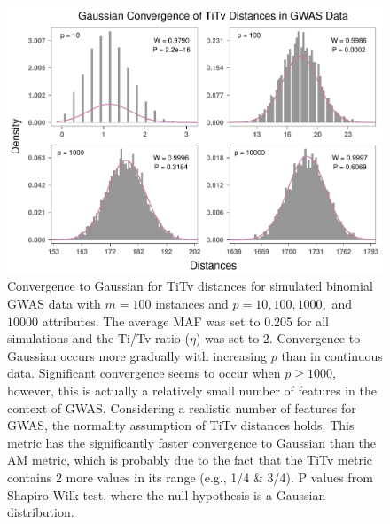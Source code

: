 \documentclass[10pt,letterpaper]{article}\usepackage[]{graphicx}\usepackage[]{color}
\begin{document}
\begin{figure}[H]
	\includegraphics[width=\textwidth]{central_limit_hist_gwas_TiTv.pdf}
	\caption{Convergence to Gaussian for TiTv distances for simulated binomial GWAS data with $m=100$ instances and $p=10, 100, 1000,$ and $10000$ attributes. The average MAF was set to 0.205 for all simulations and the Ti/Tv ratio ($\eta$) was set to 2. Convergence to Gaussian occurs more gradually with increasing $p$ than in continuous data. Significant convergence seems to occur when $p \geq 1000$, however, this is actually a relatively small number of features in the context of GWAS. Considering a realistic number of features for GWAS, the normality assumption of TiTv distances holds. This metric has the significantly faster convergence to Gaussian than the AM metric, which is probably due to the fact that the TiTv metric contains 2 more values in its range (e.g., 1/4 \& 3/4). P values from Shapiro-Wilk test, where the null hypothesis is a Gaussian distribution.}
\end{figure}
\end{document}
